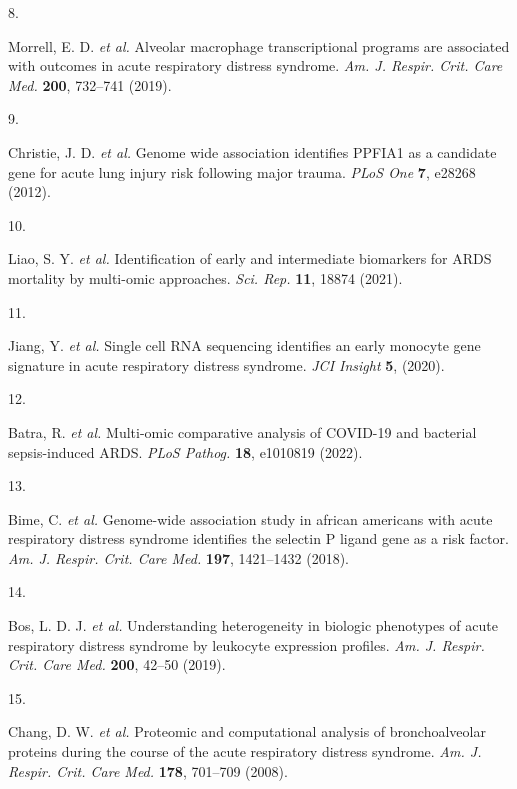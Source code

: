 \documentclass[
  11,
  a4paper,
]{article}
\newlength{\cslhangindent}
\newlength{\csllabelwidth}
\newlength{\cslentryspacingunit} %
\newenvironment{CSLReferences}[2] %
 {%
  \setlength{\parindent}{0pt}
  \ifodd #1
  \let\oldpar\par
  \def\par{\hangindent=\cslhangindent\oldpar}
  \fi
  \setlength{\parskip}{#2\cslentryspacingunit}
 }%
 {}
\newcommand{\CSLLeftMargin}[1]{\parbox[t]{\csllabelwidth}{#1}}
\newcommand{\CSLRightInline}[1]{\parbox[t]{\linewidth - \csllabelwidth}{#1}\break}
\begin{document}
\begin{CSLReferences}{0}{0}
\leavevmode{}%
\CSLLeftMargin{8. }%
\CSLRightInline{Morrell, E. D. \emph{et al.} Alveolar macrophage
transcriptional programs are associated with outcomes in acute
respiratory distress syndrome. \emph{Am. J. Respir. Crit. Care Med.}
\textbf{200}, 732--741 (2019).}

\leavevmode{}%
\CSLLeftMargin{9. }%
\CSLRightInline{Christie, J. D. \emph{et al.} Genome wide association
identifies {PPFIA1} as a candidate gene for acute lung injury risk
following major trauma. \emph{PLoS One} \textbf{7}, e28268 (2012).}

\leavevmode{}%
\CSLLeftMargin{10. }%
\CSLRightInline{Liao, S. Y. \emph{et al.} Identification of early and
intermediate biomarkers for {ARDS} mortality by multi-omic approaches.
\emph{Sci. Rep.} \textbf{11}, 18874 (2021).}

\leavevmode{}%
\CSLLeftMargin{11. }%
\CSLRightInline{Jiang, Y. \emph{et al.} Single cell {RNA} sequencing
identifies an early monocyte gene signature in acute respiratory
distress syndrome. \emph{JCI Insight} \textbf{5}, (2020).}

\leavevmode{}%
\CSLLeftMargin{12. }%
\CSLRightInline{Batra, R. \emph{et al.} Multi-omic comparative analysis
of {COVID-19} and bacterial sepsis-induced {ARDS}. \emph{PLoS Pathog.}
\textbf{18}, e1010819 (2022).}

\leavevmode{}%
\CSLLeftMargin{13. }%
\CSLRightInline{Bime, C. \emph{et al.} Genome-wide association study in
african americans with acute respiratory distress syndrome identifies
the selectin {P} ligand gene as a risk factor. \emph{Am. J. Respir.
Crit. Care Med.} \textbf{197}, 1421--1432 (2018).}

\leavevmode{}%
\CSLLeftMargin{14. }%
\CSLRightInline{Bos, L. D. J. \emph{et al.} Understanding heterogeneity
in biologic phenotypes of acute respiratory distress syndrome by
leukocyte expression profiles. \emph{Am. J. Respir. Crit. Care Med.}
\textbf{200}, 42--50 (2019).}

\leavevmode{}%
\CSLLeftMargin{15. }%
\CSLRightInline{Chang, D. W. \emph{et al.} Proteomic and computational
analysis of bronchoalveolar proteins during the course of the acute
respiratory distress syndrome. \emph{Am. J. Respir. Crit. Care Med.}
\textbf{178}, 701--709 (2008).}


\end{CSLReferences}
\end{document}
